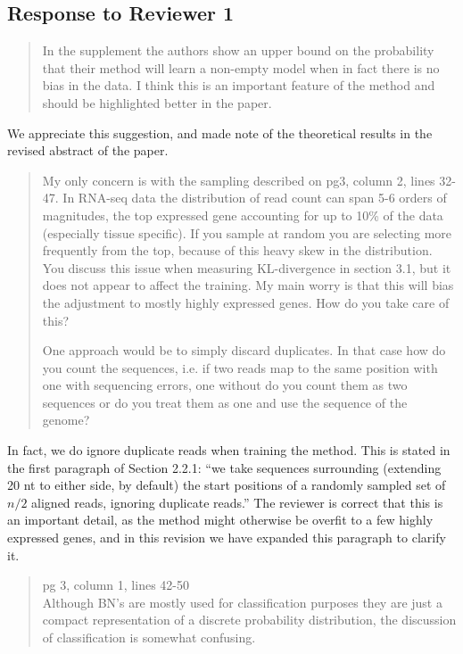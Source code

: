 \documentclass{article}
\begin{document}
\subsection*{Response to Reviewer 1}

\begin{quote}
In the supplement the authors show an upper bound on the probability that their
method will learn a non-empty model when in fact there is no bias in the data. I
think this is an important feature of the method and should be highlighted
better in the paper.
\end{quote}

We appreciate this suggestion, and made note of the theoretical results in the
revised abstract of the paper.


\begin{quote}
My only concern is with the sampling described on pg3, column 2, lines 32-47.
In RNA-seq data the distribution of read count can span 5-6 orders of
magnitudes, the top expressed gene accounting for up to 10\% of the data
(especially tissue specific). If you sample at random you are selecting more
frequently from the top, because of this heavy skew in the distribution. You
discuss this issue when measuring KL-divergence in section 3.1, but it does not
appear to affect the training. My main worry is that this will bias the
adjustment to mostly highly expressed genes. How do you take care of this?

One approach would be to simply discard duplicates. In that case how do you
count the sequences, i.e. if two reads map to the same position with one with
sequencing errors, one without do you count them as two sequences or do you
treat them as one and use the sequence of the genome?
\end{quote}

In fact, we do ignore duplicate reads when training the method. This is stated
in the first paragraph of Section 2.2.1: ``we take sequences surrounding
(extending 20 nt to either side, by default) the start positions of a randomly
sampled set of $n/2$ aligned reads, ignoring duplicate reads.'' The reviewer is
correct that this is an important detail, as the method might otherwise be
overfit to a few highly expressed genes, and in this revision we have expanded
this paragraph to clarify it.


\begin{quote}
pg 3, column 1, lines 42-50 \\
Although BN's are mostly used for classification purposes they are just a
compact representation of a discrete probability distribution, the discussion
of classification is somewhat confusing.
\end{quote}
\end{document}
